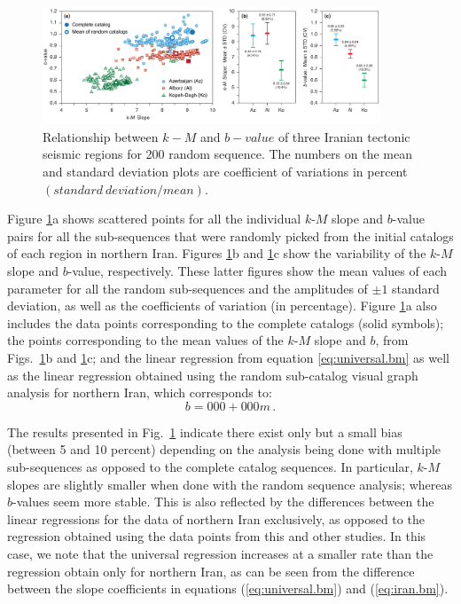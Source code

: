 \begin{figure}%
	\centering
	\includegraphics[width=0.9\textwidth]{figures/pdf/figure-08} 
	\caption{Relationship between $k-M$ and $b-value$ of three Iranian tectonic seismic regions for 200 random sequence. The numbers on the mean and standard deviation plots are coefficient of variations in percent $(standard \ deviation / mean)$.}
	\label{fig:random}
\end{figure}

Figure \ref{fig:random}a shows scattered points for all the individual $k$-$M$ slope and $b$-value pairs for all the sub-sequences that were randomly picked from the initial catalogs of each region in northern Iran. Figures \ref{fig:random}b and \ref{fig:random}c show the variability of the $k$-$M$ slope and $b$-value, respectively. These latter figures show the mean values of each parameter for all the random sub-sequences and the amplitudes of $\pm 1$ standard deviation, as well as the coefficients of variation (in percentage). Figure \ref{fig:random}a also includes the data points corresponding to the complete catalogs (solid symbols); the points corresponding to the mean values of the $k$-$M$ slope and $b$, from Figs.~\ref{fig:random}b and \ref{fig:random}c; and the linear regression from equation \ref{eq:universal.bm} as well as the linear regression obtained using the random sub-catalog visual graph analysis for northern Iran, which corresponds to:
% 
\begin{equation}
	b = 000 + 000 m \, .
	\label{eq:iran.bm}
\end{equation}

The results presented in Fig.~\ref{fig:random} indicate there exist only but a small bias (between 5 and 10 percent) depending on the analysis being done with multiple sub-sequences as opposed to the complete catalog sequences. In particular, $k$-$M$ slopes are slightly smaller when done with the random sequence analysis; whereas $b$-values seem more stable. This is also reflected by the differences between the linear regressions for the data of northern Iran exclusively, as opposed to the regression obtained using the data points from this and other studies. In this case, we note that the universal regression increases at a smaller rate than the regression obtain only for northern Iran, as can be seen from the difference between the slope coefficients in equations (\ref{eq:universal.bm}) and (\ref{eq:iran.bm}).

